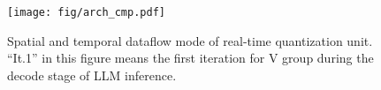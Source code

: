 \begin{figure}[t] 
    \centering 
    \texttt{[image: fig/arch\_cmp.pdf]}  
    \caption{Spatial and temporal dataflow mode of real-time quantization unit. ``It.1'' in this figure means the first iteration for V group during the decode stage of LLM inference.} 
    \label{fig:arch_cmp}
\end{figure}
